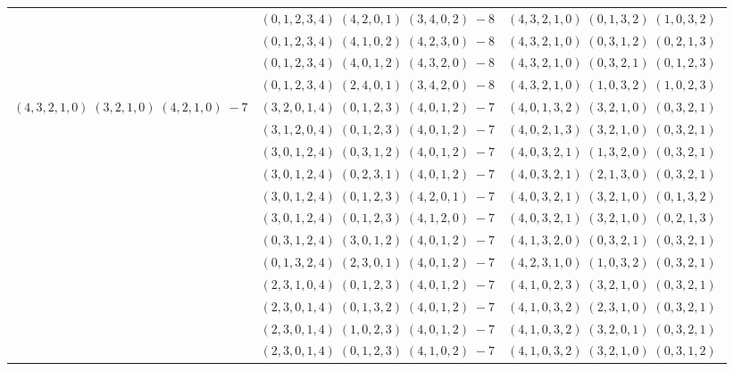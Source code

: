 \documentclass[11pt]{article}
\begin{document}
\begin{longtable}[l]{|c|c|c|}
 \cline{2-3} 
 & $(0 ,1 ,2 ,3 ,4) \;(4 ,2 ,0 ,1) \;(3 ,4 ,0 ,2) \;-8$ & $(4 ,3 ,2 ,1 ,0) \;(0 ,1 ,3 ,2) \;(1 ,0 ,3 ,2) \;$\\ 
 \cline{2-3} 
 & $(0 ,1 ,2 ,3 ,4) \;(4 ,1 ,0 ,2) \;(4 ,2 ,3 ,0) \;-8$ & $(4 ,3 ,2 ,1 ,0) \;(0 ,3 ,1 ,2) \;(0 ,2 ,1 ,3) \;$\\ 
 \cline{2-3} 
 & $(0 ,1 ,2 ,3 ,4) \;(4 ,0 ,1 ,2) \;(4 ,3 ,2 ,0) \;-8$ & $(4 ,3 ,2 ,1 ,0) \;(0 ,3 ,2 ,1) \;(0 ,1 ,2 ,3) \;$\\ 
 \cline{2-3} 
 & $(0 ,1 ,2 ,3 ,4) \;(2 ,4 ,0 ,1) \;(3 ,4 ,2 ,0) \;-8$ & $(4 ,3 ,2 ,1 ,0) \;(1 ,0 ,3 ,2) \;(1 ,0 ,2 ,3) \;$\\ \hline\multirow[t]{24}{*}{ $(4 ,3 ,2 ,1 ,0) \;(3 ,2 ,1 ,0) \;(4 ,2 ,1 ,0) \;-7$ }  & $(3 ,2 ,0 ,1 ,4) \;(0 ,1 ,2 ,3) \;(4 ,0 ,1 ,2) \;-7$ & $(4 ,0 ,1 ,3 ,2) \;(3 ,2 ,1 ,0) \;(0 ,3 ,2 ,1) \;$\\ 
 \cline{2-3} 
 & $(3 ,1 ,2 ,0 ,4) \;(0 ,1 ,2 ,3) \;(4 ,0 ,1 ,2) \;-7$ & $(4 ,0 ,2 ,1 ,3) \;(3 ,2 ,1 ,0) \;(0 ,3 ,2 ,1) \;$\\ 
 \cline{2-3} 
 & $(3 ,0 ,1 ,2 ,4) \;(0 ,3 ,1 ,2) \;(4 ,0 ,1 ,2) \;-7$ & $(4 ,0 ,3 ,2 ,1) \;(1 ,3 ,2 ,0) \;(0 ,3 ,2 ,1) \;$\\ 
 \cline{2-3} 
 & $(3 ,0 ,1 ,2 ,4) \;(0 ,2 ,3 ,1) \;(4 ,0 ,1 ,2) \;-7$ & $(4 ,0 ,3 ,2 ,1) \;(2 ,1 ,3 ,0) \;(0 ,3 ,2 ,1) \;$\\ 
 \cline{2-3} 
 & $(3 ,0 ,1 ,2 ,4) \;(0 ,1 ,2 ,3) \;(4 ,2 ,0 ,1) \;-7$ & $(4 ,0 ,3 ,2 ,1) \;(3 ,2 ,1 ,0) \;(0 ,1 ,3 ,2) \;$\\ 
 \cline{2-3} 
 & $(3 ,0 ,1 ,2 ,4) \;(0 ,1 ,2 ,3) \;(4 ,1 ,2 ,0) \;-7$ & $(4 ,0 ,3 ,2 ,1) \;(3 ,2 ,1 ,0) \;(0 ,2 ,1 ,3) \;$\\ 
 \cline{2-3} 
 & $(0 ,3 ,1 ,2 ,4) \;(3 ,0 ,1 ,2) \;(4 ,0 ,1 ,2) \;-7$ & $(4 ,1 ,3 ,2 ,0) \;(0 ,3 ,2 ,1) \;(0 ,3 ,2 ,1) \;$\\ 
 \cline{2-3} 
 & $(0 ,1 ,3 ,2 ,4) \;(2 ,3 ,0 ,1) \;(4 ,0 ,1 ,2) \;-7$ & $(4 ,2 ,3 ,1 ,0) \;(1 ,0 ,3 ,2) \;(0 ,3 ,2 ,1) \;$\\ 
 \cline{2-3} 
 & $(2 ,3 ,1 ,0 ,4) \;(0 ,1 ,2 ,3) \;(4 ,0 ,1 ,2) \;-7$ & $(4 ,1 ,0 ,2 ,3) \;(3 ,2 ,1 ,0) \;(0 ,3 ,2 ,1) \;$\\ 
 \cline{2-3} 
 & $(2 ,3 ,0 ,1 ,4) \;(0 ,1 ,3 ,2) \;(4 ,0 ,1 ,2) \;-7$ & $(4 ,1 ,0 ,3 ,2) \;(2 ,3 ,1 ,0) \;(0 ,3 ,2 ,1) \;$\\ 
 \cline{2-3} 
 & $(2 ,3 ,0 ,1 ,4) \;(1 ,0 ,2 ,3) \;(4 ,0 ,1 ,2) \;-7$ & $(4 ,1 ,0 ,3 ,2) \;(3 ,2 ,0 ,1) \;(0 ,3 ,2 ,1) \;$\\ 
 \cline{2-3} 
 & $(2 ,3 ,0 ,1 ,4) \;(0 ,1 ,2 ,3) \;(4 ,1 ,0 ,2) \;-7$ & $(4 ,1 ,0 ,3 ,2) \;(3 ,2 ,1 ,0) \;(0 ,3 ,1 ,2) \;$\\ 

\end{longtable}
\end{document}
